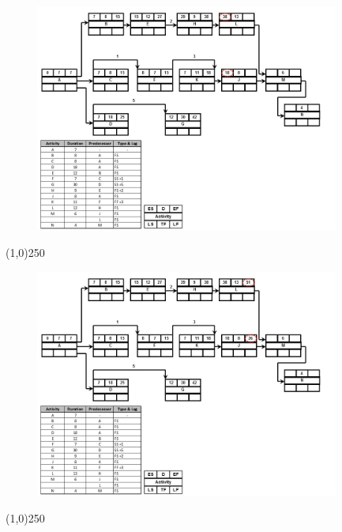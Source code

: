 \begin{frame}
\begin{figure}
	\centering
		\includegraphics[width = 10.0cm]{oldnotes/Slide212.jpg}
\end{figure}
\end{frame}
\begin{center}\line(1,0){250}\end{center}




\begin{frame}
\begin{figure}
	\centering
		\includegraphics[width = 10.0cm]{oldnotes/Slide213.jpg}
\end{figure}
\end{frame}
\begin{center}\line(1,0){250}\end{center}




